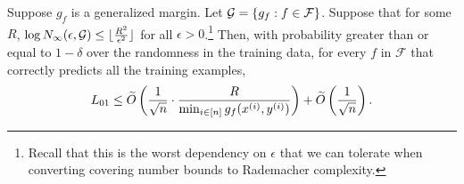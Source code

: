 \begin{lemma}
Suppose $g_f$ is a generalized margin. Let $\mathcal G = \{g_f: f \in \mathcal{F}\}$. Suppose that for some $R$, $\log N_\infty(\epsilon, \mathcal G) \leq \lfloor \frac{R^2}{\epsilon^2} \rfloor$ for all $\epsilon > 0$.\footnote{Recall that this is the worst dependency on $\epsilon$ that we can tolerate when converting covering number bounds to Rademacher complexity.} Then, with probability greater than or equal to $1 - \delta$ over the randomness in the training data, for every $f$ in $\mathcal{F}$ that correctly predicts all the training examples,
\begin{equation}
L_{01} \leq \widetilde{O} \left (\frac{1}{\sqrt{n}} \cdot \frac{R}{\min_{i \in [n]} g_f(x^{(i)}, y^{(i)})} \right ) + \widetilde{O}\left (\frac{1}{\sqrt{n}}\right ).
\end{equation}
\label{lec11:genmargin-lemma}
\end{lemma}

